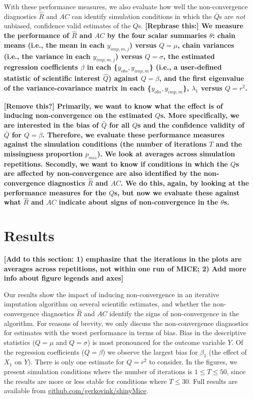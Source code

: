 \documentclass[Royal,times,sageh]{sagej}
\begin{document}
With these performance measures, we also evaluate how well the non-convergence diagnostics \(\widehat{R}\) and \(AC\) can identify simulation conditions in which the \(\bar{Q}\)s are \emph{not} unbiased, confidence valid estimates of the \(Q\)s. \textbf{{[}Rephrase this:{]} We measure the performance of \(\widehat{R}\) and \(AC\) by the four scalar summaries \(\theta\): chain means (i.e., the mean in each \(y_{imp, m, j}\)) versus \(Q=\mu\), chain variances (i.e., the variance in each \(y_{imp, m, j}\)) versus \(Q=\sigma\), the estimated regression coefficients \(\beta\) in each \{\(y_{obs}, y_{imp, m}\)\} (i.e., a user-defined statistic of scientific interest \(\hat{Q}\)) against \(Q=\beta\), and the first eigenvalue of the variance-covariance matrix in each \{\(y_{obs}, y_{imp, m}\)\}, \(\lambda_1\) versus \(Q=r^2\).}

\textbf{{[}Remove this?{]} Primarily, we want to know what the effect is of inducing non-convergence on the estimated \(Q\)s. More specifically, we are interested in the bias of \(\bar{Q}\) for all \(Q\)s and the confidence validity of \(\bar{Q}\) for \(Q=\beta\). Therefore, we evaluate these performance measures against the simulation conditions (the number of iterations \(T\) and the missingness proportion \(p_{mis}\)). We look at averages across simulation repetitions. Secondly, we want to know if conditions in which the \(Q\)s are affected by non-convergence are also identified by the non-convergence diagnostics \(\widehat{R}\) and \(AC\). We do this, again, by looking at the performance measures for the \(Q\)s, but now we evaluate these against what \(\widehat{R}\) and \(AC\) indicate about signs of non-convergence in the \(\theta\)s.}

\hypertarget{results}{%
\section{Results}\label{results}}

\textbf{{[}Add to this section: 1) emphasize that the iterations in the plots are averages across repetitions, not within one run of MICE; 2) Add more info about figure legends and axes{]}}

Our results show the impact of inducing non-convergence in an iterative imputation algorithm on several scientific estimates, and whether the non-convergence diagnostics \(\widehat{R}\) and \(AC\) identify the signs of non-convergence in the algorithm. For reasons of brevity, we only discuss the non-convergence diagnostics for estimates with the worst performance in terms of bias. Bias in the descriptive statistics (\(Q=\mu\) and \(Q=\sigma\)) is most pronounced for the outcome variable \(Y\). Of the regression coefficients (\(Q=\beta\)) we observe the largest bias for \(\beta_1\) (the effect of \(X_1\) on \(Y\)). There is only one estimate for \(Q=r^2\) to consider. In the figures, we present simulation conditions where the number of iterations is \(1 \leq T\leq50\), since the results are more or less stable for conditions where \(T \leq 30\). Full results are available from \href{https://github.com/gerkovink/shinyMice/tree/master/3.Thesis/1.SimulationStudy}{github.com/gerkovink/shinyMice}.
\end{document}
